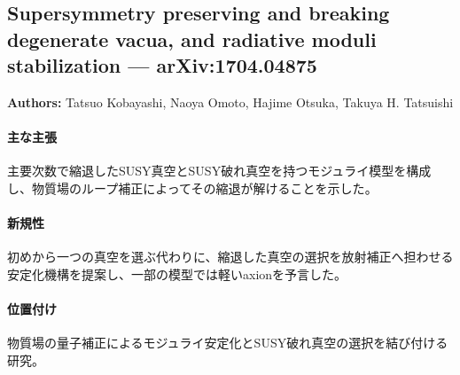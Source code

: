 \subsection{Supersymmetry preserving and breaking degenerate vacua, and radiative moduli stabilization --- arXiv:1704.04875}

\textbf{Authors:} Tatsuo Kobayashi, Naoya Omoto, Hajime Otsuka, Takuya H. Tatsuishi

\paragraph{主な主張}
主要次数で縮退したSUSY真空とSUSY破れ真空を持つモジュライ模型を構成し、物質場のループ補正によってその縮退が解けることを示した\cite{Kobayashi:2017aeu}。

\paragraph{新規性}
初めから一つの真空を選ぶ代わりに、縮退した真空の選択を放射補正へ担わせる安定化機構を提案し、一部の模型では軽いaxionを予言した。

\paragraph{位置付け}
物質場の量子補正によるモジュライ安定化とSUSY破れ真空の選択を結び付ける研究。
